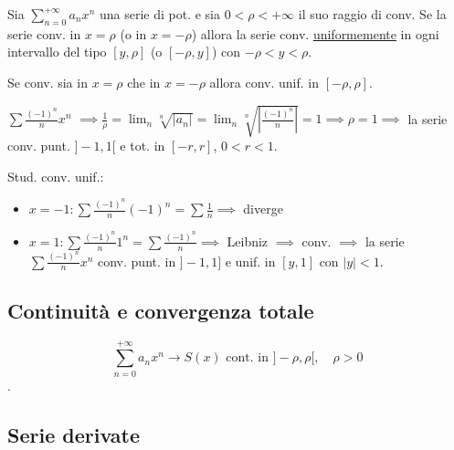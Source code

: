 \begin{theorem}
Sia $\sum_{n=0}^{+\infty} a_n x^n$ una serie di pot. e sia $0 < \rho < +\infty$ il suo raggio di conv. Se la serie conv. in $x = \rho$ (o in $x = -\rho$) allora la serie conv. \underline{uniformemente} in ogni intervallo del tipo $[y, \rho]$ (o $[-\rho, y]$) con $-\rho < y < \rho$.

Se conv. sia in $x = \rho$ che in $x = -\rho$ allora conv. unif. in $[-\rho, \rho]$.
\end{theorem}

\begin{example}
$\sum \frac{(-1)^n}{n} x^n$  $\implies \frac{1}{\rho} = \lim_{n} \sqrt[n]{\vert a_n \vert} = \lim_{n} \sqrt[n]{\left\vert \frac{(-1)^n}{n} \right\vert} = 1 \implies \rho = 1 \implies$ la serie conv. punt. $]-1, 1[$ e tot. in $[-r, r]$, $0 < r < 1$.

Stud. conv. unif.:
\begin{itemize}
    \item $x = -1 : \sum \frac{(-1)^n}{n} (-1)^n = \sum \frac{1}{n} \implies$ diverge
    \item $x = 1 : \sum \frac{(-1)^n}{n} 1^n = \sum \frac{(-1)^n}{n} \implies$ Leibniz $\implies$ conv. $\implies$ la serie $\sum \frac{(-1)^n}{n} x^n$ conv. punt. in $]-1, 1]$ e unif. in $[y, 1]$ con $\vert y \vert < 1$.
\end{itemize}
\end{example}


\subsection{Continuità e convergenza totale}

\[
\sum_{n=0}^{+\infty} a_n x^n \to S(x) \text{ cont. in } ]-\rho, \rho[, \quad \rho > 0
\]
.

\subsection{Serie derivate}


